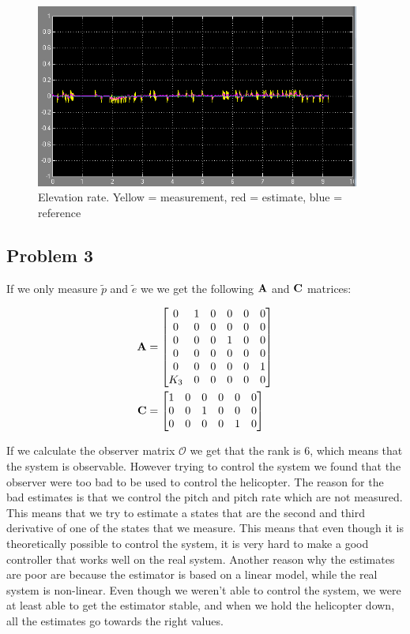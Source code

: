 \begin{figure}[H]
	\centering
	\includegraphics[width=0.95\textwidth]{images/est_med_int/ed_est.png}
	\caption{Elevation rate. Yellow = measurement, red = estimate, blue = reference}
	\label{fig:edest}
\end{figure}


\subsection{Problem 3}
If we only measure $\tilde p$ and $\tilde e$ we we get the following $\mathbf{A}$ and $\mathbf{C}$ matrices:

\begin{subequations}
	\begin{align}
		\mathbf{A} &= \begin{bmatrix}
			0 & 1 & 0 & 0 & 0 & 0\\
			0 & 0 & 0 & 0 & 0 & 0\\
			0 & 0 & 0 & 1 & 0 & 0\\
			0 & 0 & 0 & 0 & 0 & 0\\
			0 & 0 & 0 & 0 & 0 & 1\\
			K_3 & 0 & 0 & 0 & 0 & 0
		\end{bmatrix}\\
		\mathbf{C} &= \begin{bmatrix}
			1 & 0 & 0 & 0 & 0 & 0\\
			0 & 0 & 1 & 0 & 0 & 0\\
			0 & 0 & 0 & 0 & 1 & 0
		\end{bmatrix}
	\end{align}
\end{subequations}

If we calculate the observer matrix $\mathcal{O}$ we get that the rank is 6, which means that the system is observable. However trying to control the system we found that the observer were too bad to be used to control the helicopter. The reason for the bad estimates is that we control the pitch and pitch rate which are not measured. This means that we try to estimate a states that are the second and third derivative of one of the states that we measure. This means that even though it is theoretically possible to control the system, it is very hard to make a good controller that works well on the real system. Another reason why the estimates are poor are because the estimator is based on a linear model, while the real system is non-linear. Even though we weren't able to control the system, we were at least able to get the estimator stable, and when we hold the helicopter down, all the estimates go towards the right values.